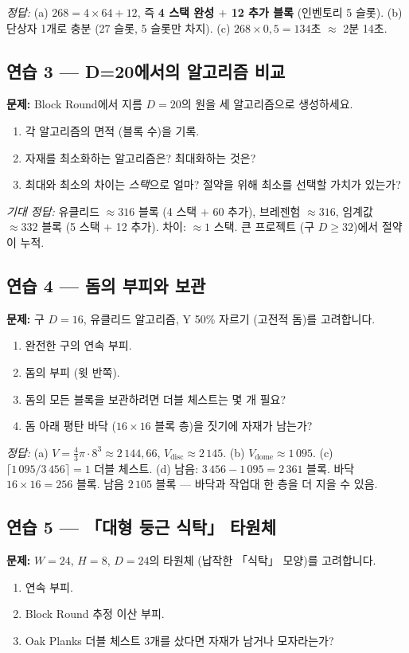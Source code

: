 \documentclass[12pt,a4paper]{scrartcl}
\newcommand{\acc}[1]{\textcolor{accent}{\textbf{#1}}}
\begin{document}
\emph{정답:} (a) $268 = 4 \times 64 + 12$, 즉 \acc{4 스택 완성 $+$ 12 추가 블록} (인벤토리 5 슬롯). (b) 단상자 1개로 충분 (27 슬롯, 5 슬롯만 차지). (c) $268 \times 0{,}5 = 134$초 $\approx$ 2분 14초.

\subsection*{연습 3 --- D=20에서의 알고리즘 비교}
\textbf{문제:} Block Round에서 지름 $D = 20$의 원을 세 알고리즘으로 생성하세요.
\begin{enumerate}[label=\alph*),leftmargin=1.5em,itemsep=0.1em,topsep=0.2em,nosep]
  \item 각 알고리즘의 면적 (블록 수)을 기록.
  \item 자재를 최소화하는 알고리즘은? 최대화하는 것은?
  \item 최대와 최소의 차이는 \emph{스택}으로 얼마? 절약을 위해 최소를 선택할 가치가 있는가?
\end{enumerate}

\emph{기대 정답:} 유클리드 $\approx 316$ 블록 (4 스택 $+$ 60 추가), 브레젠험 $\approx 316$, 임계값 $\approx 332$ 블록 (5 스택 $+$ 12 추가). 차이: $\approx 1$ 스택. 큰 프로젝트 (구 $D \geq 32$)에서 절약이 누적.

\subsection*{연습 4 --- 돔의 부피와 보관}
\textbf{문제:} 구 $D = 16$, 유클리드 알고리즘, Y 50\% 자르기 (고전적 돔)를 고려합니다.
\begin{enumerate}[label=\alph*),leftmargin=1.5em,itemsep=0.1em,topsep=0.2em,nosep]
  \item 완전한 구의 연속 부피.
  \item 돔의 부피 (윗 반쪽).
  \item 돔의 모든 블록을 보관하려면 더블 체스트는 몇 개 필요?
  \item 돔 아래 평탄 바닥 ($16 \times 16$ 블록 층)을 짓기에 자재가 남는가?
\end{enumerate}

\emph{정답:}
(a) $V = \tfrac{4}{3}\pi \cdot 8^3 \approx 2\,144{,}66$, $V_{\mathrm{disc}} \approx 2\,145$. (b) $V_{\mathrm{dome}} \approx 1\,095$. (c) $\lceil 1\,095 / 3\,456 \rceil = 1$ 더블 체스트. (d) 남음: $3\,456 - 1\,095 = 2\,361$ 블록. 바닥 $16 \times 16 = 256$ 블록. 남음 $2\,105$ 블록 --- 바닥과 작업대 한 층을 더 지을 수 있음.

\subsection*{연습 5 --- 「대형 둥근 식탁」 타원체}
\textbf{문제:} $W = 24$, $H = 8$, $D = 24$의 타원체 (납작한 「식탁」 모양)를 고려합니다.
\begin{enumerate}[label=\alph*),leftmargin=1.5em,itemsep=0.1em,topsep=0.2em,nosep]
  \item 연속 부피.
  \item Block Round 추정 이산 부피.
  \item Oak Planks 더블 체스트 3개를 샀다면 자재가 남거나 모자라는가?
\end{enumerate}
\end{document}
